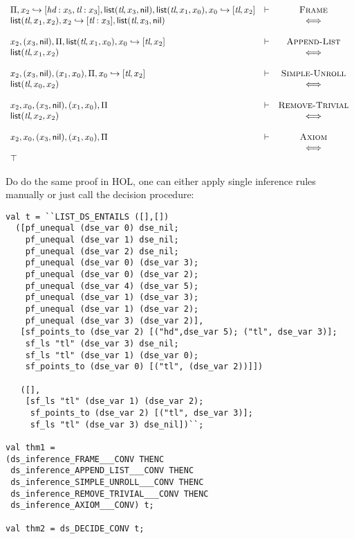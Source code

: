 \documentclass{scrartcl}
\theoremstyle{definition}
\newcommand{\HOL}{{\sf HOL}}
\newcommand{\nil}{{\textsf{nil}}}
\newcommand{\sfpointsto}[2]{#1 \hookrightarrow [#2]}
\newcommand{\sflist}{{\textsf{list}}}
\begin{document}
\[\begin{array}{llc}
\Pi,\sfpointsto {x_2} {\textit{hd}:x_5, \textit{tl}:x_3},\sflist(\textit{tl},x_3,\nil), \sflist(\textit{tl},x_1,x_0),
\sfpointsto {x_0} {\textit{tl},x_2} & \vdash & \textsc{Frame} \\
\sflist(\textit{tl},x_1,x_2), \sfpointsto {x_2} {\textit{tl}:x_3},
\sflist(\textit{tl},x_3,\nil) & & \Longleftrightarrow \\
\\

x_2,(x_3,\nil),\Pi, \sflist(\textit{tl},x_1,x_0),
\sfpointsto {x_0} {\textit{tl},x_2} & \vdash & \text{\textsc{Append-List}} \\
\sflist(\textit{tl},x_1,x_2) & & \Longleftrightarrow \\
\\

x_2,(x_3,\nil),(x_1,x_0),\Pi,
\sfpointsto {x_0} {\textit{tl},x_2} & \vdash & \textsc{Simple-Unroll} \\
\sflist(\textit{tl},x_0,x_2) & & \Longleftrightarrow \\
\\

x_2,x_0,(x_3,\nil),(x_1,x_0),\Pi & \vdash & \textsc{Remove-Trivial} \\
\sflist(\textit{tl},x_2,x_2) & & \Longleftrightarrow \\
\\

x_2,x_0,(x_3,\nil),(x_1,x_0),\Pi & \vdash & \textsc{Axiom} \\
 & & \Longleftrightarrow \\

\top
\end{array}
\]


Do do the same proof in \HOL, one can either apply single inference rules manually or just
call the decision procedure:
\begin{verbatim}
val t = ``LIST_DS_ENTAILS ([],[])
  ([pf_unequal (dse_var 0) dse_nil; 
    pf_unequal (dse_var 1) dse_nil;
    pf_unequal (dse_var 2) dse_nil;
    pf_unequal (dse_var 0) (dse_var 3);
    pf_unequal (dse_var 0) (dse_var 2);
    pf_unequal (dse_var 4) (dse_var 5);
    pf_unequal (dse_var 1) (dse_var 3);
    pf_unequal (dse_var 1) (dse_var 2);
    pf_unequal (dse_var 3) (dse_var 2)],
   [sf_points_to (dse_var 2) [("hd",dse_var 5); ("tl", dse_var 3)];
    sf_ls "tl" (dse_var 3) dse_nil;
    sf_ls "tl" (dse_var 1) (dse_var 0);
    sf_points_to (dse_var 0) [("tl", (dse_var 2))]])

   ([],
    [sf_ls "tl" (dse_var 1) (dse_var 2);
     sf_points_to (dse_var 2) [("tl", dse_var 3)];
     sf_ls "tl" (dse_var 3) dse_nil])``;

val thm1 = 
(ds_inference_FRAME___CONV THENC
 ds_inference_APPEND_LIST___CONV THENC
 ds_inference_SIMPLE_UNROLL___CONV THENC
 ds_inference_REMOVE_TRIVIAL___CONV THENC
 ds_inference_AXIOM___CONV) t;

val thm2 = ds_DECIDE_CONV t;
\end{verbatim}
\end{document}
